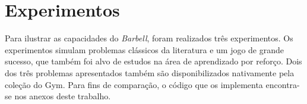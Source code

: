 \documentclass[cic,tc]{iiufrgs}
\newcommand\bruno[1]{\textcolor{magenta}{#1}}
\begin{document}
%
%

\chapter{Experimentos}

Para ilustrar as capacidades do \textit{Barbell}, foram realizados três
experimentos. Os experimentos simulam problemas clássicos da literatura e um
jogo de grande sucesso, que também foi alvo de estudos na área de aprendizado
por reforço. Dois dos três problemas apresentados também são disponibilizados
nativamente pela coleção do Gym. Para fins de comparação, o código que os
implementa encontra-se nos anexos deste trabalho.
\end{document}
